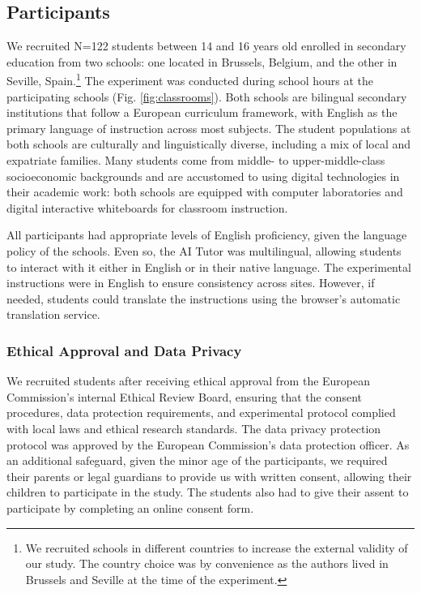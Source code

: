 \documentclass[
  12pt,
]{article}
\begin{document}
\subsection{Participants}\label{participants}

We recruited N=122 students between 14 and 16 years old enrolled in secondary education from two schools: one located in Brussels, Belgium, and the other in Seville, Spain.\footnote{We recruited schools in different countries to increase the external validity of our study. The country choice was by convenience as the authors lived in Brussels and Seville at the time of the experiment.} The experiment was conducted during school hours at the participating schools (Fig. \ref{fig:classrooms}). Both schools are bilingual secondary institutions that follow a European curriculum framework, with English as the primary language of instruction across most subjects. The student populations at both schools are culturally and linguistically diverse, including a mix of local and expatriate families. Many students come from middle- to upper-middle-class socioeconomic backgrounds and are accustomed to using digital technologies in their academic work: both schools are equipped with computer laboratories and digital interactive whiteboards for classroom instruction.

All participants had appropriate levels of English proficiency, given the language policy of the schools. Even so, the AI Tutor was multilingual, allowing students to interact with it either in English or in their native language. The experimental instructions were in English to ensure consistency across sites. However, if needed, students could translate the instructions using the browser's automatic translation service.

\subsubsection{Ethical Approval and Data Privacy}\label{ethical-approval-and-data-privacy}

We recruited students after receiving ethical approval from the European Commission's internal Ethical Review Board, ensuring that the consent procedures, data protection requirements, and experimental protocol complied with local laws and ethical research standards. The data privacy protection protocol was approved by the European Commission's data protection officer. As an additional safeguard, given the minor age of the participants, we required their parents or legal guardians to provide us with written consent, allowing their children to participate in the study. The students also had to give their assent to participate by completing an online consent form.
\end{document}
